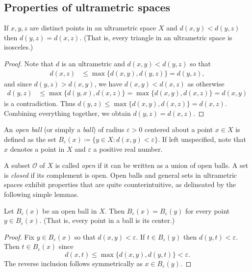 \subsection{Properties of ultrametric spaces}
\begin{lemma}
If \( x, y, z \) are distinct points in an ultrametric space \( X \) and \( d(x,y) < d(y,z) \) then \( d(y,z) = d(x,z) \). (That is, every triangle in an ultrametric space is isosceles.)
\end{lemma}
\begin{proof}
Note that \( d \) is an ultrametric and \( d(x,y) < d(y,z) \) so that
\begin{align*}
	d(x, z) &\leq \max \{ d(x,y), d(y, z) \} = d(y,z),
\end{align*}
and since \( d(y,z) > d(x,y) \), we have \( d(x,y) < d(x,z) \) as otherwise
\begin{align*}
	d(y,z) &\leq \max \{ d(y, x) , d(x, z) \} = \max \{ d(x,y) , d(x,z) \} = d(x,y)
\end{align*}
is a contradiction. Thus \( d(y,z) \leq \max \{ d(x,y), d(x,z) \} = d(x,z) \). Combining everything together, we obtain \( d(y,z) = d(x,z) \).
\end{proof}



An \emph{open ball} (or simply a \emph{ball}) of radius \( \varepsilon > 0 \) centered about a point \( x \in  X \) is defined as the set \( B_{\varepsilon }(x) \coloneqq \{ y \in X : d(x,y) < \varepsilon  \}  \). If left unspecified, note that \( x \) denotes a point in \( X \) and \( \varepsilon  \) a positive real number. 

A subset \( \mathcal{O}  \) of \( X \) is called \emph{open} if it can be written as a union of open balls. A set is \emph{closed} if its complement is open. Open balls and general sets in ultrametric spaces exhibit properties that are quite counterintuitive, as delineated by the following simple lemmas.
\begin{lemma}
Let \( B_{\varepsilon } (x) \) be an open ball in \( X \). Then \( B_{\varepsilon } (x) = B_{\varepsilon } (y) \) for every point \( y \in B_{\varepsilon } (x) \). (That is, every point in a ball is its center.)
\end{lemma}
\begin{proof}
Fix \( y \in B_{\varepsilon } (x) \) so that \( d(x,y) < \varepsilon  \). If \( t \in B_{\varepsilon } (y) \) then \( d(y,t) < \varepsilon  \). Then \( t \in B_{\varepsilon } (x) \) since \[ d(x, t) \leq \max \{ d(x,y), d(y,t) \} < \varepsilon . \] The reverse inclusion follows symmetrically as \( x \in B_{\varepsilon } (y) \).
\end{proof}

